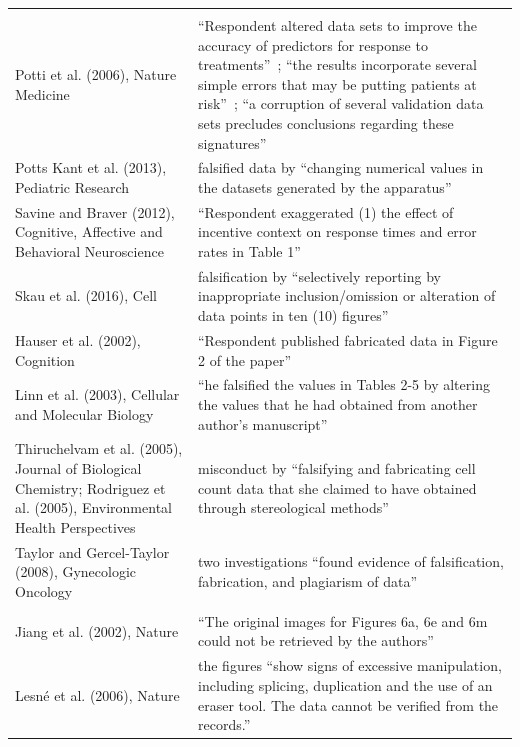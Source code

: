 {\begin{longtable}{@{}>{\raggedright\arraybackslash}p{}>{\raggedright\arraybackslash}p{}@{}}
\midrule
\multicolumn{2}{@{}l}{\textbf{Data fabricated or falsified}} \\ \nopagebreak
Potti et al. (2006), Nature Medicine & ``Respondent altered data sets to improve the accuracy of predictors for response to treatments''~\citep{ori2015potti}; ``the results incorporate several simple errors that may be putting patients at risk''~\citep{baggerly2009deriving}; ``a corruption of several validation data sets precludes conclusions regarding these signatures''~\citep{potti2011retraction} \\
Potts Kant et al. (2013), Pediatric Research & falsified data by ``changing numerical values in the datasets generated by the apparatus''~\citep{ori2019pottskant} \\
Savine and Braver (2012), Cognitive, Affective and Behavioral Neuroscience & ``Respondent exaggerated (1) the effect of incentive context on response times and error rates in Table 1''~\citep{ori2013savine} \\
Skau et al. (2016), Cell & falsification by ``selectively reporting by inappropriate inclusion/omission or alteration of data points in ten (10) figures''~\citep{ori2018skau} \\
Hauser et al. (2002), Cognition & ``Respondent published fabricated data in Figure 2 of the paper''~\citep{ori2012hauser} \\
Linn et al. (2003), Cellular and Molecular Biology & ``he falsified the values in Tables 2-5 by altering the values that he had obtained from another author's manuscript''~\citep{ori2010linn} \\
Thiruchelvam et al. (2005), Journal of Biological Chemistry; Rodriguez et al. (2005), Environmental Health Perspectives & misconduct by ``falsifying and fabricating cell count data that she claimed to have obtained through stereological methods''~\citep{ori2012thiruchelvam} \\
Taylor and Gercel-Taylor (2008), Gynecologic Oncology & two investigations ``found evidence of falsification, fabrication, and plagiarism of data''~\citep{taylor_notice_2023} \\
\midrule
\multicolumn{2}{@{}l}{\textbf{Image manipulation or duplication}} \\ \nopagebreak
Jiang et al. (2002), Nature & ``The original images for Figures 6a, 6e and 6m could not be retrieved by the authors''~\citep{jiang2024retraction} \\
Lesné et al. (2006), Nature & the figures ``show signs of excessive manipulation, including splicing, duplication and the use of an eraser tool. The data cannot be verified from the records.''~\citep{lesne2024retraction} \\

\end{longtable}}
